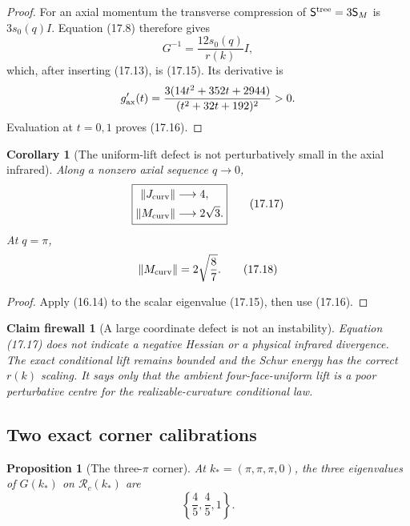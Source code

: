 \documentclass[11pt,oneside]{book}
\newtheorem{proposition}[theorem]{Proposition}
\newtheorem{corollary}[theorem]{Corollary}
\newtheorem{firewall}[theorem]{Claim firewall}
\theoremstyle{definition}
\theoremstyle{remark}
\begin{document}
\begin{proof}
For an axial momentum the transverse compression of
\(\mathsf S^{\rm tree}=3\mathsf S_M\) is \(3s_0(q)I\).
Equation (17.8) therefore gives
\[
 G^{-1}
 =\frac{12s_0(q)}{r(k)}I,
\]
which, after inserting (17.13), is (17.15).  Its derivative is
\[
 g_{\rm ax}'(t)
 =\frac{3(14t^2+352t+2944)}
        {(t^2+32t+192)^2}>0.
\]
Evaluation at \(t=0,1\) proves (17.16).
\end{proof}

\begin{corollary}[The uniform-lift defect is not perturbatively small
in the axial infrared]
\label{cor:e8v17-axial-defect}
Along a nonzero axial sequence \(q\to0\),
\[
\boxed{
\begin{aligned}
\|J_{\rm curv}\|&\longrightarrow4,\\
\|M_{\rm curv}\|&\longrightarrow2\sqrt3.
\end{aligned}}                                      \tag{17.17}
\]
At \(q=\pi\),
\[
 \|M_{\rm curv}\|=2\sqrt{\frac87}.                  \tag{17.18}
\]
\end{corollary}

\begin{proof}
Apply (16.14) to the scalar eigenvalue (17.15), then use (17.16).
\end{proof}

\begin{firewall}[A large coordinate defect is not an instability]
\label{fire:e8v17-large-defect}
Equation (17.17) does not indicate a negative Hessian or a physical
infrared divergence.  The exact conditional lift remains bounded and
the Schur energy has the correct \(r(k)\) scaling.  It says only that
the ambient four-face-uniform lift is a poor perturbative centre for
the realizable-curvature conditional law.
\end{firewall}

\subsection{Two exact corner calibrations}

\begin{proposition}[The three-\(\pi\) corner]
\label{prop:e8v17-three-pi}
At \(k_*=(\pi,\pi,\pi,0)\), the three eigenvalues of \(G(k_*)\) on
\(\mathcal R_c(k_*)\) are
\[
                         \left\{\frac45,\frac45,1\right\}.          \tag{17.19}
\]
\end{proposition}
\end{document}
